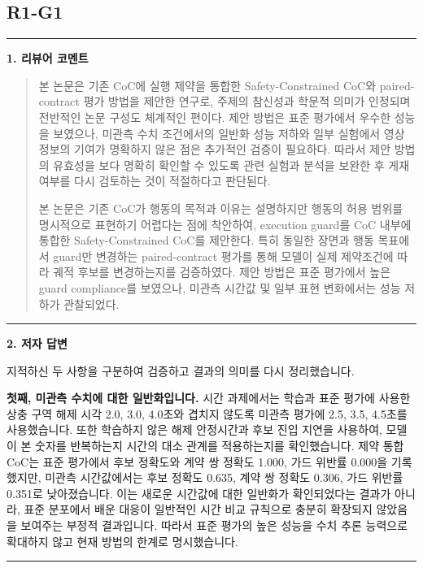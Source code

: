 \documentclass[11pt]{article}
\newcommand{\fieldheading}[2]{%
  \par\medskip\noindent
  {\color{#1}\rule{3pt}{1.25em}}\hspace{0.55em}\textbf{#2}\par\smallskip}
\newenvironment{reviewitem}[1]
  {\subsection*{#1}}
  {\par\medskip\hrule\bigskip}
\newenvironment{reviewercomment}
  {\fieldheading{reviewercolor}{1. 리뷰어 코멘트}%
   \begin{quote}}
  {\end{quote}}
\newenvironment{authorresponse}
  {\fieldheading{responsecolor}{2. 저자 답변}}
  {\par}
\begin{document}
\begin{reviewitem}{R1-G1}
  \begin{reviewercomment}
    본 논문은 기존 CoC에 실행 제약을 통합한 Safety-Constrained CoC와
    paired-contract 평가 방법을 제안한 연구로, 주제의 참신성과 학문적 의미가
    인정되며 전반적인 논문 구성도 체계적인 편이다. 제안 방법은 표준 평가에서
    우수한 성능을 보였으나, 미관측 수치 조건에서의 일반화 성능 저하와 일부
    실험에서 영상 정보의 기여가 명확하지 않은 점은 추가적인 검증이 필요하다.
    따라서 제안 방법의 유효성을 보다 명확히 확인할 수 있도록 관련 실험과
    분석을 보완한 후 게재 여부를 다시 검토하는 것이 적절하다고 판단된다.

    본 논문은 기존 CoC가 행동의 목적과 이유는 설명하지만 행동의 허용 범위를
    명시적으로 표현하기 어렵다는 점에 착안하여, execution guard를 CoC 내부에
    통합한 Safety-Constrained CoC를 제안한다. 특히 동일한 장면과 행동 목표에서
    guard만 변경하는 paired-contract 평가를 통해 모델이 실제 제약조건에 따라
    궤적 후보를 변경하는지를 검증하였다. 제안 방법은 표준 평가에서 높은 guard
    compliance를 보였으나, 미관측 시간값 및 일부 표현 변화에서는 성능 저하가
    관찰되었다.
  \end{reviewercomment}

  \begin{authorresponse}
    지적하신 두 사항을 구분하여 검증하고 결과의 의미를 다시 정리했습니다.

    \textbf{첫째, 미관측 수치에 대한 일반화입니다.} 시간 과제에서는 학습과 표준
    평가에 사용한 상충 구역 해제 시각 2.0, 3.0, 4.0초와 겹치지 않도록 미관측
    평가에 2.5, 3.5, 4.5초를 사용했습니다. 또한 학습하지 않은 해제 안정시간과
    후보 진입 지연을 사용하여, 모델이 본 숫자를 반복하는지 시간의 대소 관계를
    적용하는지를 확인했습니다. 제약 통합 CoC는 표준 평가에서 후보 정확도와 계약
    쌍 정확도 1.000, 가드 위반률 0.000을 기록했지만, 미관측 시간값에서는 후보
    정확도 0.635, 계약 쌍 정확도 0.306, 가드 위반률 0.351로 낮아졌습니다. 이는
    새로운 시간값에 대한 일반화가 확인되었다는 결과가 아니라, 표준 분포에서 배운
    대응이 일반적인 시간 비교 규칙으로 충분히 확장되지 않았음을 보여주는 부정적
    결과입니다. 따라서 표준 평가의 높은 성능을 수치 추론 능력으로 확대하지 않고
    현재 방법의 한계로 명시했습니다.


\end{authorresponse}
\end{reviewitem}
\end{document}
